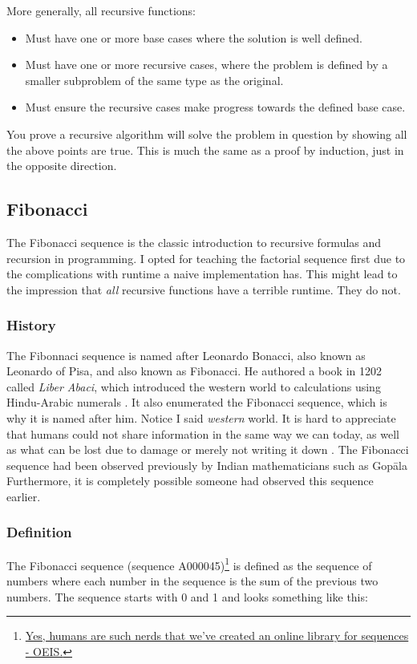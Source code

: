 More generally, all recursive functions:
\begin{itemize}
	\item Must have one or more base cases where the solution is well defined.
	\item Must have one or more recursive cases, where the problem is defined by a smaller subproblem of the same type as the original.
	\item Must ensure the recursive cases make progress towards the defined base case.
\end{itemize}


You prove a recursive algorithm will solve the problem in question by showing all the above points are true.  
This is much the same as a proof by induction, just in the opposite direction.

\subsection{Fibonacci}

The Fibonacci sequence is the classic introduction to recursive formulas and recursion in programming.  I opted for teaching the factorial sequence first due to the complications with runtime a naive implementation has.  This might lead to the impression that \textit{all} recursive functions have a terrible runtime.  They do not.  





\subsubsection{History}
The Fibonnaci sequence is named after Leonardo Bonacci, also known as Leonardo of Pisa, and also known as Fibonacci.  He authored a book in 1202 called \textit{Liber Abaci}, which introduced the western world to calculations using Hindu-Arabic numerals .  It also enumerated the Fibonacci sequence, which is why it is named after him\cite{Bonacci1202,sigler2002fibonacci}.   Notice I said \textit{western} world.  It is hard to appreciate that humans could not share information in the same way we can today, as well as what can be lost due to damage or merely not writing it down .   The Fibonacci sequence had been observed previously by Indian mathematicians such as Gop\={a}la  \cite{singh1985fib}
Furthermore, it is completely possible someone had observed this sequence earlier.

\subsubsection{Definition}
The Fibonacci sequence  (sequence A000045)\footnote{\href{https://oeis.org/}{Yes, humans are such nerds that we've created an online library for sequences - OEIS.}} is defined as the sequence of numbers where each number in the sequence is the sum of the previous two numbers.  The sequence starts with 0 and 1  and looks something like this:

